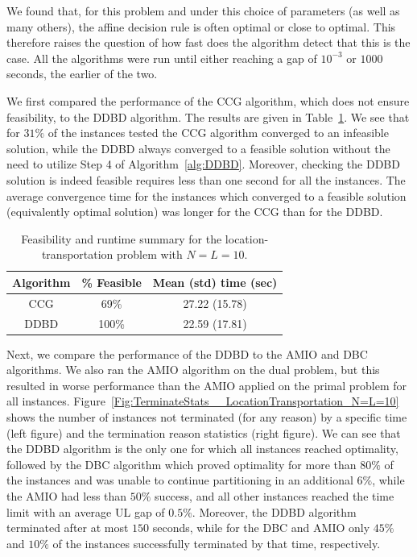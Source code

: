 \documentclass[12pt,x11names]{article}
\theoremstyle{definition}
\begin{document}
We found that, for this problem and under this choice of parameters (as well as many others), the affine decision rule is often optimal or close to optimal. This therefore raises the question of how fast does the algorithm detect that this is the case. All the algorithms were run until either reaching a gap of $10^{-3}$ or $1000$ seconds, the earlier of the two.

We first compared the performance of the CCG algorithm, which does not ensure feasibility, to the DDBD algorithm. The results are given in Table~\ref{tbl:CCG_Compare_LocationTransportation_N=L=10}. We see that for $31\%$ of the instances tested the CCG algorithm converged to an infeasible solution, while the DDBD always converged to a feasible solution without the need to utilize Step 4 of Algorithm~\ref{alg:DDBD}. Moreover, checking the DDBD solution is indeed feasible requires less than one second for all the instances. The average convergence time for the instances which converged to a feasible solution (equivalently optimal solution) was longer for the CCG than for the DDBD.
\begin{table}[!h]
\centering
\caption{Feasibility and runtime summary for the location-transportation problem with $N=L=10$.}\label{tbl:CCG_Compare_LocationTransportation_N=L=10}
{\renewcommand{\arraystretch}{0.7}
\setlength{\extrarowheight}{.1em}
\begin{tabular}{|c||c|c|}
\hline
Algorithm & \% Feasible & Mean (std) time (sec)\\
\hline
CCG & 69\% & 27.22 (15.78)\\
DDBD & 100\% & 22.59 (17.81)\\
\hline
\end{tabular}}
\end{table}

Next, we compare the performance of the DDBD to the AMIO and DBC algorithms. We also ran the AMIO algorithm on the dual problem, but this resulted in worse performance than the AMIO applied on the primal problem for all instances. Figure~\ref{Fig:TerminateStats__LocationTransportation_N=L=10} shows the number of instances not terminated (for any reason) by a specific time (left figure) and the termination reason statistics (right figure). We can see that the DDBD algorithm is the only one for which all instances reached optimality, followed by the DBC algorithm which  proved optimality for more than $80\%$ of the instances and was unable to continue partitioning in an additional $6\%$, while the AMIO had less than $50\%$ success, and all other instances reached the time limit with an average UL gap of $0.5\%$. Moreover, the DDBD algorithm terminated after at most $150$ seconds, while for the DBC and AMIO only $45\%$ and  $10\%$ of the instances successfully terminated by that time, respectively. 
\end{document}
